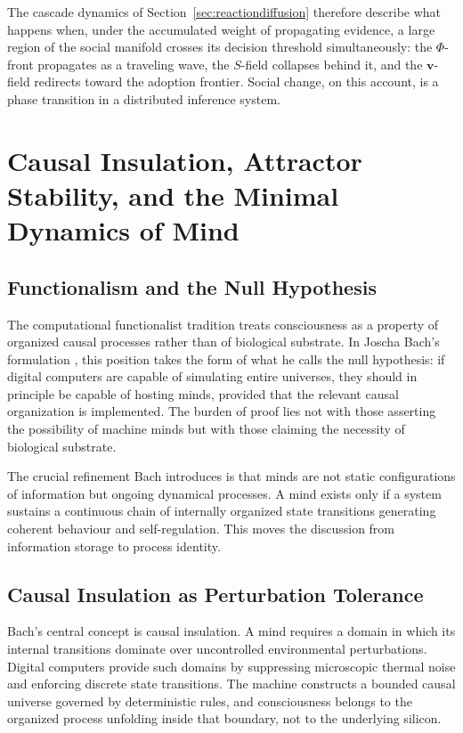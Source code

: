 \documentclass[12pt,a4paper]{article}
\theoremstyle{plain}
\theoremstyle{definition}
\begin{document}
The cascade dynamics of Section~\ref{sec:reactiondiffusion} therefore describe what happens when, under the accumulated weight of propagating evidence, a large region of the social manifold crosses its decision threshold simultaneously: the $\Phi$-front propagates as a traveling wave, the $S$-field collapses behind it, and the $\mathbf{v}$-field redirects toward the adoption frontier. Social change, on this account, is a phase transition in a distributed inference system.

\section{Causal Insulation, Attractor Stability, and the Minimal Dynamics of Mind}
\label{sec:mind}

\subsection{Functionalism and the Null Hypothesis}

The computational functionalist tradition treats consciousness as a property of organized causal processes rather than of biological substrate. In Joscha Bach's formulation \cite{Bach2019}, this position takes the form of what he calls the null hypothesis: if digital computers are capable of simulating entire universes, they should in principle be capable of hosting minds, provided that the relevant causal organization is implemented. The burden of proof lies not with those asserting the possibility of machine minds but with those claiming the necessity of biological substrate.

The crucial refinement Bach introduces is that minds are not static configurations of information but ongoing dynamical processes. A mind exists only if a system sustains a continuous chain of internally organized state transitions generating coherent behaviour and self-regulation. This moves the discussion from information storage to process identity.

\subsection{Causal Insulation as Perturbation Tolerance}

Bach's central concept is causal insulation. A mind requires a domain in which its internal transitions dominate over uncontrolled environmental perturbations. Digital computers provide such domains by suppressing microscopic thermal noise and enforcing discrete state transitions. The machine constructs a bounded causal universe governed by deterministic rules, and consciousness belongs to the organized process unfolding inside that boundary, not to the underlying silicon.
\end{document}
